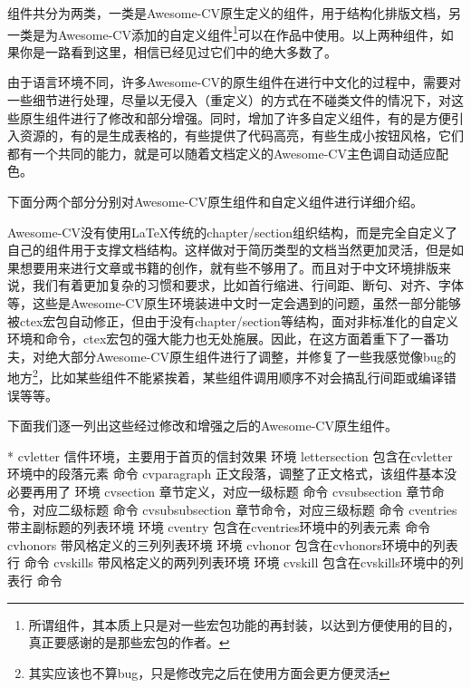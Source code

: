 组件共分为两类，一类是Awesome-CV原生定义的组件，用于结构化排版文档，另一类是{\dk}为Awesome-CV添加的自定义组件\footnote{所谓组件，其本质上只是对一些宏包功能的再封装，以达到方便使用的目的，真正要感谢的是那些宏包的作者。}可以在作品中使用。以上两种组件，如果你是一路看到这里，相信已经见过它们中的绝大多数了。

由于语言环境不同，许多Awesome-CV的原生组件在进行中文化的过程中，需要对一些细节进行处理，{\dk}尽量以无侵入（重定义）的方式在不碰类文件的情况下，对这些原生组件进行了修改和部分增强。同时，{\dk}增加了许多自定义组件，有的是方便引入资源的，有的是生成表格的，有些提供了代码高亮，有些生成小按钮风格，它们都有一个共同的能力，就是可以随着文档定义的Awesome-CV主色调自动适应配色。

下面分两个部分分别对Awesome-CV原生组件和{\dk}自定义组件进行详细介绍。

Awesome-CV没有使用{\LaTeX}传统的chapter/section组织结构，而是完全自定义了自己的组件用于支撑文档结构。这样做对于简历类型的文档当然更加灵活，但是如果想要用来进行文章或书籍的创作，就有些不够用了。而且对于中文环境排版来说，我们有着更加复杂的习惯和要求，比如首行缩进、行间距、断句、对齐、字体等，这些是Awesome-CV原生环境装进中文时一定会遇到的问题，虽然一部分能够被ctex宏包自动修正，但由于没有chapter/section等结构，面对非标准化的自定义环境和命令，ctex宏包的强大能力也无处施展。因此，{\dk}在这方面着重下了一番功夫，对绝大部分Awesome-CV原生组件进行了调整，并修复了一些我感觉像bug的地方\footnote{其实应该也不算bug，只是修改完之后在使用方面会更方便灵活}，比如某些组件不能紧挨着，某些组件调用顺序不对会搞乱行间距或编译错误等等。

下面我们逐一列出这些经过修改和增强之后的Awesome-CV原生组件。

\begin{cvhonors}*
  \cvhonor
  {cvletter}
  {信件环境，主要用于首页的信封效果}
  {环境}
  \cvhonor
  {lettersection}
  {包含在cvletter环境中的段落元素}
  {命令}
  \cvhonor
  {cvparagraph}
  {正文段落，{\dk}调整了正文格式，该组件基本没必要再用了}
  {环境}
  \cvhonor
  {cvsection}
  {章节定义，对应一级标题}
  {命令}
  \cvhonor
  {cvsubsection}
  {章节命令，对应二级标题}
  {命令}
  \cvhonor
  {cvsubsubsection}
  {章节命令，对应三级标题}
  {命令}
  \cvhonor
  {cventries}
  {带主副标题的列表环境}
  {环境}
  \cvhonor
  {cventry}
  {包含在cventries环境中的列表元素}
  {命令}
  \cvhonor
  {cvhonors}
  {带风格定义的三列列表环境}
  {环境}
  \cvhonor
  {cvhonor}
  {包含在cvhonors环境中的列表行}
  {命令}
  \cvhonor
  {cvskills}
  {带风格定义的两列列表环境}
  {环境}
  \cvhonor
  {cvskill}
  {包含在cvskills环境中的列表行}
  {命令}
\end{cvhonors}

